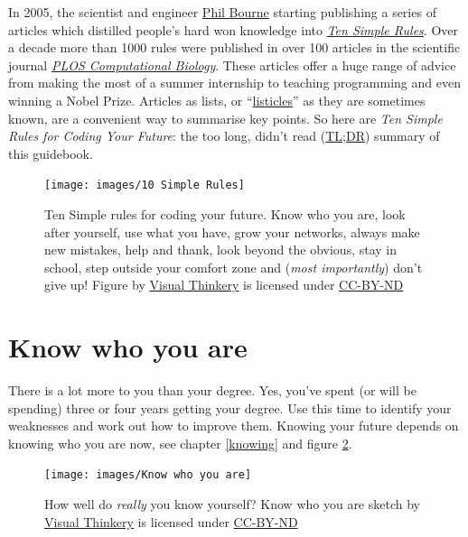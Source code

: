 \documentclass[
]{book}
\begin{document}
In 2005, the scientist and engineer \href{https://en.wikipedia.org/wiki/Philip_Bourne}{Phil Bourne} starting publishing a series of articles which distilled people's hard won knowledge into \emph{\href{https://collections.plos.org/ten-simple-rules}{Ten Simple Rules}}. \citep{Bourne2005} Over a decade more than 1000 rules were published in over 100 articles in the scientific journal \emph{\href{https://en.wikipedia.org/wiki/PLOS_Computational_Biology}{PLOS Computational Biology}}. \citep{Bourne2018} These articles offer a huge range of advice from making the most of a summer internship \citep{Aicher2017} to teaching programming \citep{tensimplebrown} and even winning a Nobel Prize. \citep{Roberts2015} Articles as lists, or ``\href{https://en.wikipedia.org/wiki/Listicle}{listicles}'' as they are sometimes known, are a convenient way to summarise key points. So here are \emph{Ten Simple Rules for Coding Your Future}: the too long, didn't read (\href{https://en.wiktionary.org/wiki/too_long;_didn\%27t_read}{TL;DR}) summary of this guidebook.

\begin{figure}

{\centering \texttt{[image: images/10 Simple Rules]} 

}

\caption{Ten Simple rules for coding your future. Know who you are, look after yourself, use what you have, grow your networks, always make new mistakes, help and thank, look beyond the obvious, stay in school, step outside your comfort zone and (\emph{most importantly}) don't give up! Figure by \href{https://visualthinkery.com/}{Visual Thinkery} is licensed under \href{https://creativecommons.org/licenses/by-nd/4.0/}{CC-BY-ND}}\label{fig:ten-simple-fig}
\end{figure}



\hypertarget{mybrand}{%
\section{Know who you are}\label{mybrand}}

There is a lot more to you than your degree. Yes, you've spent (or will be spending) three or four years getting your degree. Use this time to identify your weaknesses and work out how to improve them. Knowing your future depends on knowing who you are now, see chapter \ref{knowing} and figure \ref{fig:knowing-fig}.

\begin{figure}

{\centering \texttt{[image: images/Know who you are]} 

}

\caption{How well do \emph{really} you know yourself? Know who you are sketch by \href{https://visualthinkery.com}{Visual Thinkery} is licensed under \href{https://creativecommons.org/licenses/by-nd/4.0/}{CC-BY-ND}}\label{fig:knowing-fig}
\end{figure}
\end{document}
